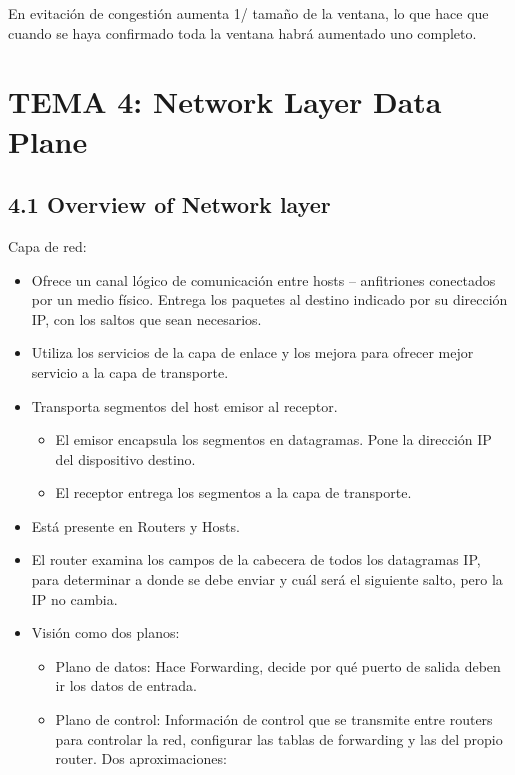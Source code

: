 \documentclass[12pt, twoside, openright]{report} %
\begin{document}
En evitación de congestión aumenta 1/ tamaño de la ventana, lo que
hace que cuando se haya confirmado toda la ventana habrá aumentado
uno completo.

\chapter{TEMA 4: Network Layer Data Plane}

\section{4.1 Overview of Network layer}

Capa de red:

\begin{itemize}
	\item Ofrece un canal lógico de comunicación entre hosts -- anfitriones
	      conectados por un medio físico. Entrega los paquetes al destino
	      indicado por su dirección IP, con los saltos que sean necesarios.
	\item Utiliza los servicios de la capa de enlace y los mejora para
	      ofrecer mejor servicio a la capa de transporte.
	\item Transporta segmentos del host emisor al receptor.

	      \begin{itemize}
		      \item El emisor encapsula los segmentos en datagramas. Pone la
		            dirección IP del dispositivo destino.
		      \item El receptor entrega los segmentos a la capa de transporte.
	      \end{itemize}
	\item Está presente en Routers y Hosts.
	\item El router examina los campos de la cabecera de todos los
	      datagramas IP, para determinar a donde se debe enviar y cuál será
	      el siguiente salto, pero la IP no cambia.
	\item Visión como dos planos:

	      \begin{itemize}
		      \item Plano de datos: Hace Forwarding, decide por qué puerto de salida
		            deben ir los datos de entrada.
		      \item Plano de control: Información de control que se transmite entre
		            routers para controlar la red, configurar las tablas de
		            forwarding y las del propio router. Dos aproximaciones:


\end{itemize}
\end{itemize}
\end{document}
